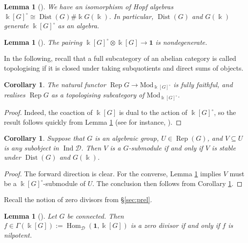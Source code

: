 \documentclass[11pt]{amsart}
\def\Dist{\operatorname{Dist}}
\def\Ind{\operatorname{Ind}}
\def\Hom{\operatorname{Hom}}
\def\Ds{\mathscr{D}}
\def\bk{\Bbbk}
\def\Rep{\operatorname{Rep}}
\def\Mod{\mathrm{Mod}}
\def\sub{\subseteq}
\newtheorem{cor}[thm]{Corollary}
\newtheorem{lemma}[thm]{Lemma}
\theoremstyle{definition}
\theoremstyle{remark}
\numberwithin{equation}{section}
\newcommand{\unit}{\mathbf{1}}
\begin{document}
\begin{lemma}[{\cite[Lem.~3.3]{CS}}]\label{lemma decom k[G] circ} 
    We have an isomorphism of Hopf algebras $\Bbbk[G]^\circ\cong\Dist(G)\#\Bbbk G(\Bbbk)$.  In particular, $\Dist(G)$ and $G(\Bbbk)$ generate $\Bbbk[G]^\circ$ as an algebra.
\end{lemma}

\begin{lemma}[{\cite[Prop.~3.4]{CS}}]\label{lemma nondeg pairing}
    The pairing $\Bbbk[G]^\circ\otimes\Bbbk[G]\to\mathbf{1}$ is nondegenerate.
\end{lemma}



In the following, recall that a full subcategory of an abelian category is called topologising if it is closed under taking subquotients and direct sums of objects.
\begin{cor}\label{cor rep G to dist ff}
    The natural functor $\Rep G\to \Mod_{\Bbbk[G]^\circ}$ is fully faithful, and realises $\Rep G$ as a topologising subcategory of $\Mod_{\Bbbk[G]^\circ}$.
\end{cor}

\begin{proof}
    Indeed, the coaction of $\Bbbk[G]$ is dual to the action of $\Bbbk[G]^\circ$, so the result follows quickly from Lemma \ref{lemma nondeg pairing} (see for instance, \cite[Sec.~7.17]{J}).
\end{proof}



\begin{cor}\label{cor G stable sub}
    Suppose that $G$ is an algebraic group, $U\in\Rep(G)$, and $V\sub U$ is any subobject in $\Ind\Ds$.  Then $V$ is a $G$-submodule if and only if $V$ is stable under $\Dist(G)$ and $G(\Bbbk)$.  
\end{cor}
\begin{proof}
The forward direction is clear.  For the converse, Lemma \ref{lemma decom k[G] circ} {implies} $V$ must be a $\Bbbk[G]^\circ$-submodule of $U$.  The conclusion then follows from Corollary \ref{cor rep G to dist ff}.
\end{proof}


Recall the notion of zero divisors from \S \ref{sec:prel}.

\begin{lemma}[{\cite[Lem.~3.5]{CS}}]\label{lemma conn zero div}
    Let $G$ be connected.  Then $f\in\Gamma(\Bbbk[G]):=\Hom_{\Ds}(
    \unit,\bk[G]    )$ is a zero divisor if and only if $f$ is nilpotent.
\end{lemma}
\end{document}
